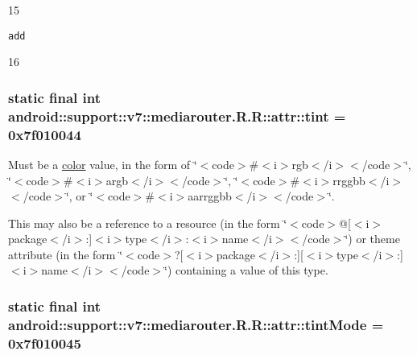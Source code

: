 15

{\tt add}

16\hypertarget{classandroid_1_1support_1_1v7_1_1mediarouter_1_1_r_1_1attr_af0dff836cc292c2ed6025c8099bbfa6}{
\subsubsection[{tint}]{\setlength{\rightskip}{0pt plus 5cm}static final int android::support::v7::mediarouter.R.R::attr::tint = 0x7f010044}}
\label{classandroid_1_1support_1_1v7_1_1mediarouter_1_1_r_1_1attr_af0dff836cc292c2ed6025c8099bbfa6}


Must be a \hyperlink{classandroid_1_1support_1_1v7_1_1mediarouter_1_1_r_1_1color}{color} value, in the form of \char`\"{}$<$code$>$\#$<$i$>$rgb$<$/i$>$$<$/code$>$\char`\"{}, \char`\"{}$<$code$>$\#$<$i$>$argb$<$/i$>$$<$/code$>$\char`\"{}, \char`\"{}$<$code$>$\#$<$i$>$rrggbb$<$/i$>$$<$/code$>$\char`\"{}, or \char`\"{}$<$code$>$\#$<$i$>$aarrggbb$<$/i$>$$<$/code$>$\char`\"{}. 

This may also be a reference to a resource (in the form \char`\"{}$<$code$>$@\mbox{[}$<$i$>$package$<$/i$>$:\mbox{]}$<$i$>$type$<$/i$>$:$<$i$>$name$<$/i$>$$<$/code$>$\char`\"{}) or theme attribute (in the form \char`\"{}$<$code$>$?\mbox{[}$<$i$>$package$<$/i$>$:\mbox{]}\mbox{[}$<$i$>$type$<$/i$>$:\mbox{]}$<$i$>$name$<$/i$>$$<$/code$>$\char`\"{}) containing a value of this type. \hypertarget{classandroid_1_1support_1_1v7_1_1mediarouter_1_1_r_1_1attr_182f9bea6bebdae805bcbb8b1b4145e4}{
\subsubsection[{tintMode}]{\setlength{\rightskip}{0pt plus 5cm}static final int android::support::v7::mediarouter.R.R::attr::tintMode = 0x7f010045}}
\label{classandroid_1_1support_1_1v7_1_1mediarouter_1_1_r_1_1attr_182f9bea6bebdae805bcbb8b1b4145e4}


